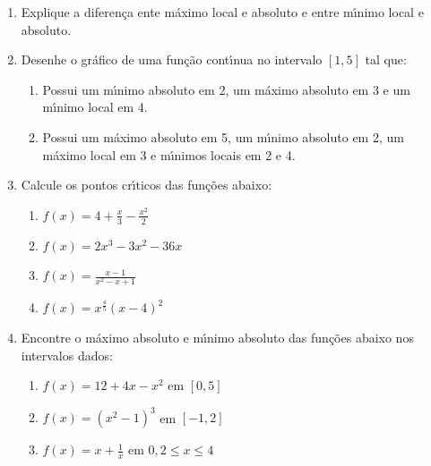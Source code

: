 \documentclass[a4paper,5pt]{amsbook}
\newcommand{\ds}{\displaystyle}
\begin{document}
\vspace{1cm}
\begin{enumerate}
    \vspace{0.5cm}
    \item Explique a diferen\c{c}a ente m\'aximo local e absoluto e entre m\'{\i}nimo
	    local e absoluto.

    \vspace{0.5cm}
    \item Desenhe o gr\'afico de uma fun\c{c}\~ao cont\'{\i}nua no intervalo $[1, 5]$ tal que:
        \begin{enumerate}
            \item Possui um m\'{\i}nimo absoluto em 2, um m\'aximo absoluto em 3 e
		    um m\'{\i}nimo local em 4.
            \item Possui um m\'aximo absoluto em 5, um m\'{\i}nimo absoluto em 2, um
		    m\'aximo local em 3 e m\'{\i}nimos locais em 2 e 4.
        \end{enumerate}

    \vspace{0.5cm}
    \item Calcule os pontos cr\'{\i}ticos das fun\c{c}\~oes abaixo:
        \begin{enumerate}
            \item $f(x) = 4+\ds\frac{x}{3}-\frac{x^2}{2}$
            \item $f(x) = 2x^3-3x^2-36x$
            \item $f(x) = \ds\frac{x-1}{x^2-x+1}$
            \item $f(x) = x^{\frac{4}{5}}{(x-4)}^2$
        \end{enumerate}

    \vspace{0.5cm}
    \item Encontre o m\'aximo absoluto e m\'{\i}nimo absoluto das fun\c{c}\~oes abaixo nos
	    intervalos dados:
        \begin{enumerate}
            \item $f(x) = 12+4x-x^2$ em $[0, 5]$
            \item $f(x) = {(x^2-1)}^3$ em $[-1, 2]$
            \item $f(x) = x+\ds\frac{1}{x}$ em $0,2 \le x \le 4$
        \end{enumerate}


\end{enumerate}
\end{document}
